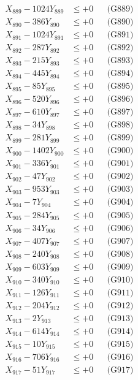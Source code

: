 \documentclass[a4paper,10pt]{article}
\begin{document}
{\begin{align}
X_{889} - 1024Y_{889} &\leq +0 && \text{(G889)} \\
X_{890} - 386Y_{890} &\leq +0 && \text{(G890)} \\
\allowbreak
X_{891} - 1024Y_{891} &\leq +0 && \text{(G891)} \\
X_{892} - 287Y_{892} &\leq +0 && \text{(G892)} \\
X_{893} - 215Y_{893} &\leq +0 && \text{(G893)} \\
X_{894} - 445Y_{894} &\leq +0 && \text{(G894)} \\
X_{895} - 85Y_{895} &\leq +0 && \text{(G895)} \\
X_{896} - 520Y_{896} &\leq +0 && \text{(G896)} \\
X_{897} - 610Y_{897} &\leq +0 && \text{(G897)} \\
X_{898} - 34Y_{898} &\leq +0 && \text{(G898)} \\
X_{899} - 281Y_{899} &\leq +0 && \text{(G899)} \\
X_{900} - 1402Y_{900} &\leq +0 && \text{(G900)} \\
\allowbreak
X_{901} - 336Y_{901} &\leq +0 && \text{(G901)} \\
X_{902} - 47Y_{902} &\leq +0 && \text{(G902)} \\
X_{903} - 953Y_{903} &\leq +0 && \text{(G903)} \\
X_{904} - 7Y_{904} &\leq +0 && \text{(G904)} \\
X_{905} - 284Y_{905} &\leq +0 && \text{(G905)} \\
X_{906} - 34Y_{906} &\leq +0 && \text{(G906)} \\
X_{907} - 407Y_{907} &\leq +0 && \text{(G907)} \\
X_{908} - 240Y_{908} &\leq +0 && \text{(G908)} \\
X_{909} - 603Y_{909} &\leq +0 && \text{(G909)} \\
X_{910} - 340Y_{910} &\leq +0 && \text{(G910)} \\
\allowbreak
X_{911} - 126Y_{911} &\leq +0 && \text{(G911)} \\
X_{912} - 204Y_{912} &\leq +0 && \text{(G912)} \\
X_{913} - 2Y_{913} &\leq +0 && \text{(G913)} \\
X_{914} - 614Y_{914} &\leq +0 && \text{(G914)} \\
X_{915} - 10Y_{915} &\leq +0 && \text{(G915)} \\
X_{916} - 706Y_{916} &\leq +0 && \text{(G916)} \\
X_{917} - 51Y_{917} &\leq +0 && \text{(G917)} \\

\end{align}}
\end{document}
